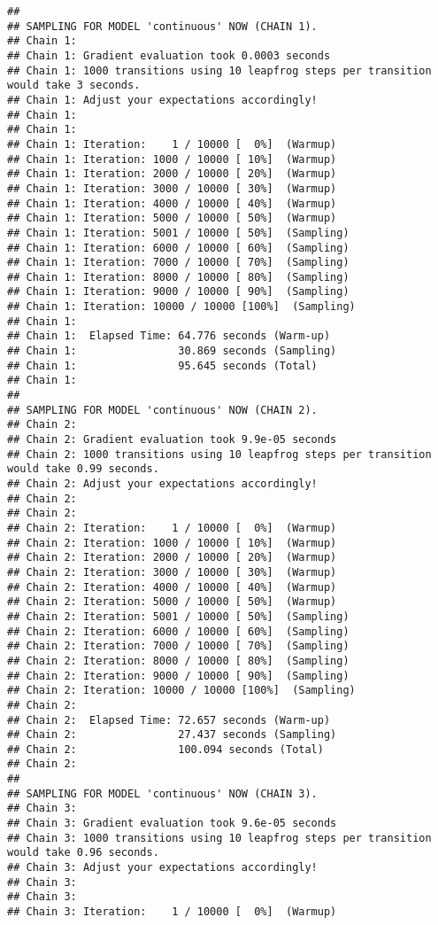 \documentclass[
]{article}
\begin{document}
\begin{verbatim}
## 
## SAMPLING FOR MODEL 'continuous' NOW (CHAIN 1).
## Chain 1: 
## Chain 1: Gradient evaluation took 0.0003 seconds
## Chain 1: 1000 transitions using 10 leapfrog steps per transition would take 3 seconds.
## Chain 1: Adjust your expectations accordingly!
## Chain 1: 
## Chain 1: 
## Chain 1: Iteration:    1 / 10000 [  0%]  (Warmup)
## Chain 1: Iteration: 1000 / 10000 [ 10%]  (Warmup)
## Chain 1: Iteration: 2000 / 10000 [ 20%]  (Warmup)
## Chain 1: Iteration: 3000 / 10000 [ 30%]  (Warmup)
## Chain 1: Iteration: 4000 / 10000 [ 40%]  (Warmup)
## Chain 1: Iteration: 5000 / 10000 [ 50%]  (Warmup)
## Chain 1: Iteration: 5001 / 10000 [ 50%]  (Sampling)
## Chain 1: Iteration: 6000 / 10000 [ 60%]  (Sampling)
## Chain 1: Iteration: 7000 / 10000 [ 70%]  (Sampling)
## Chain 1: Iteration: 8000 / 10000 [ 80%]  (Sampling)
## Chain 1: Iteration: 9000 / 10000 [ 90%]  (Sampling)
## Chain 1: Iteration: 10000 / 10000 [100%]  (Sampling)
## Chain 1: 
## Chain 1:  Elapsed Time: 64.776 seconds (Warm-up)
## Chain 1:                30.869 seconds (Sampling)
## Chain 1:                95.645 seconds (Total)
## Chain 1: 
## 
## SAMPLING FOR MODEL 'continuous' NOW (CHAIN 2).
## Chain 2: 
## Chain 2: Gradient evaluation took 9.9e-05 seconds
## Chain 2: 1000 transitions using 10 leapfrog steps per transition would take 0.99 seconds.
## Chain 2: Adjust your expectations accordingly!
## Chain 2: 
## Chain 2: 
## Chain 2: Iteration:    1 / 10000 [  0%]  (Warmup)
## Chain 2: Iteration: 1000 / 10000 [ 10%]  (Warmup)
## Chain 2: Iteration: 2000 / 10000 [ 20%]  (Warmup)
## Chain 2: Iteration: 3000 / 10000 [ 30%]  (Warmup)
## Chain 2: Iteration: 4000 / 10000 [ 40%]  (Warmup)
## Chain 2: Iteration: 5000 / 10000 [ 50%]  (Warmup)
## Chain 2: Iteration: 5001 / 10000 [ 50%]  (Sampling)
## Chain 2: Iteration: 6000 / 10000 [ 60%]  (Sampling)
## Chain 2: Iteration: 7000 / 10000 [ 70%]  (Sampling)
## Chain 2: Iteration: 8000 / 10000 [ 80%]  (Sampling)
## Chain 2: Iteration: 9000 / 10000 [ 90%]  (Sampling)
## Chain 2: Iteration: 10000 / 10000 [100%]  (Sampling)
## Chain 2: 
## Chain 2:  Elapsed Time: 72.657 seconds (Warm-up)
## Chain 2:                27.437 seconds (Sampling)
## Chain 2:                100.094 seconds (Total)
## Chain 2: 
## 
## SAMPLING FOR MODEL 'continuous' NOW (CHAIN 3).
## Chain 3: 
## Chain 3: Gradient evaluation took 9.6e-05 seconds
## Chain 3: 1000 transitions using 10 leapfrog steps per transition would take 0.96 seconds.
## Chain 3: Adjust your expectations accordingly!
## Chain 3: 
## Chain 3: 
## Chain 3: Iteration:    1 / 10000 [  0%]  (Warmup)

\end{verbatim}
\end{document}
